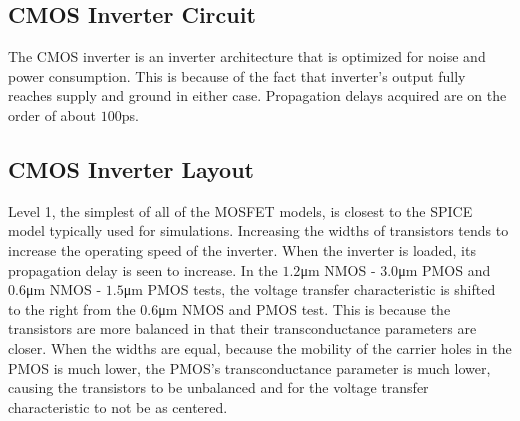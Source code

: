 \subsection{CMOS Inverter Circuit}

The CMOS inverter is an inverter architecture that is optimized for noise and power consumption. This is because of the fact that inverter's output fully reaches supply and ground in either case. Propagation delays acquired are on the order of about $100$\si{\pico\second}.

\subsection{CMOS Inverter Layout}

Level 1, the simplest of all of the MOSFET models, is closest to the SPICE model typically used for simulations. Increasing the widths of transistors tends to increase the operating speed of the inverter. When the inverter is loaded, its propagation delay is seen to increase. In the $1.2$\si{\micro\meter} NMOS - $3.0$\si{\micro\meter} PMOS and $0.6$\si{\micro\meter} NMOS - $1.5$\si{\micro\meter} PMOS tests, the voltage transfer characteristic is shifted to the right from the $0.6$\si{\micro\meter} NMOS and PMOS test. This is because the transistors are more balanced in that their transconductance parameters are closer. When the widths are equal, because the mobility of the carrier holes in the PMOS is much lower, the PMOS's transconductance parameter is much lower, causing the transistors to be unbalanced and for the voltage transfer characteristic to not be as centered.
